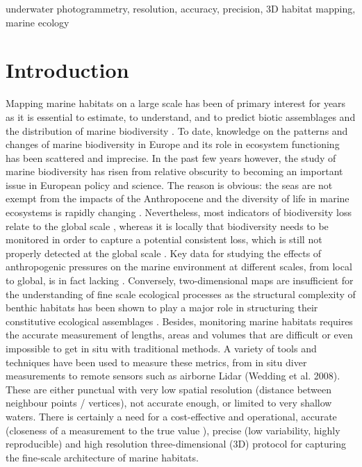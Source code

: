 underwater photogrammetry, resolution, accuracy, precision, 3D habitat mapping, marine ecology

\section{Introduction}\label{chapitre1_1}

Mapping marine habitats on a large scale has been of primary interest for years as it is essential to estimate, to understand, and to predict biotic assemblages and the distribution of marine biodiversity \citep{tittensor_mid-term_2014}. To date, knowledge on the patterns and changes of marine biodiversity in Europe and its role in ecosystem functioning has been scattered and imprecise. In the past few years however, the study of marine biodiversity has risen from relative obscurity to becoming an important issue in European policy and science. The reason is obvious: the seas are not exempt from the impacts of the Anthropocene and the diversity of life in marine ecosystems is rapidly changing \citep{mcgill_fifteen_2015}. Nevertheless, most indicators of biodiversity loss relate to the global scale \citep{pimm_biodiversity_2014}, whereas it is locally that biodiversity needs to be monitored in order to capture a potential consistent loss, which is still not properly detected at the global scale \citep{dornelas_assemblage_2014}. Key data for studying the effects of anthropogenic pressures on the marine environment at different scales, from local to global, is in fact lacking \citep{halpern_global_2008}. Conversely, two-dimensional maps are insufficient for the understanding of fine scale ecological processes as the structural complexity of benthic habitats has been shown to play a major role in structuring their constitutive ecological assemblages \citep{agudo-adriani_colony_2016, darling_relationships_2017, friedlander_designing_2003, graham_importance_2013, kovalenko_habitat_2012}. Besides, monitoring marine habitats requires the accurate measurement of lengths, areas and volumes that are difficult or even impossible to get in situ with traditional methods. A variety of tools and techniques have been used to measure these metrics, from in situ diver measurements \citep{dustan_digital_2013} to remote sensors such as airborne Lidar (Wedding et al. 2008). These are either punctual with very low spatial resolution (distance between neighbour points / vertices), not accurate enough, or limited to very shallow waters. There is certainly a need for a cost-effective and operational, accurate (closeness of a measurement to the true value \citep{granshaw_photogrammetric_2016}), precise (low variability, highly reproducible) and high resolution three-dimensional (3D) protocol for capturing the fine-scale architecture of marine habitats.

